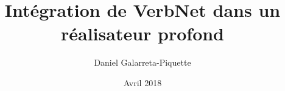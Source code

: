 

\title{Intégration de VerbNet dans un réalisateur profond}
\author{Daniel Galarreta-Piquette}
\date{Avril 2018}									%




\maketitle    
 

